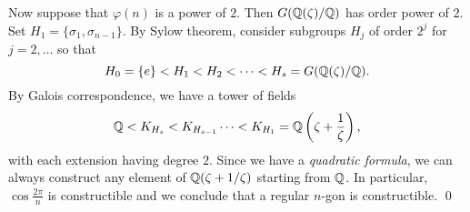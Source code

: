 \note{\mimpd} Now suppose that \(\varphi(n)\) is a power of \(2\). Then \(G(\mathbb{Q}(\zeta)/\mathbb{Q})\) has order power of \(2\). Set \(H_1 = \{\sigma_1, \sigma_{n-1}\}\). By Sylow theorem, consider subgroups \(H_j\) of order \(2^j\) for \(j = 2, \dots\) so that
\[
    H_0 = \{e\} < H_1 < H_2 < \cdots < H_s = G(\mathbb{Q}(\zeta)/\mathbb{Q}).
\]
By Galois correspondence, we have a tower of fields
\[
    \mathbb{Q} < K_{H_s} < K_{H_{s-1}} \cdots < K_{H_1} = \mathbb{Q}\left( \zeta + \frac{1}{\zeta} \right),
\]
with each extension having degree \(2\). Since we have a \textit{quadratic formula}, we can always construct any element of \(\mathbb{Q}(\zeta + 1/\zeta)\) starting from \(\mathbb{Q}\). In particular, \(\cos \frac{2\pi}{n}\) is constructible and we conclude that a regular \(n\)-gon is constructible. \qed

\pagebreak
